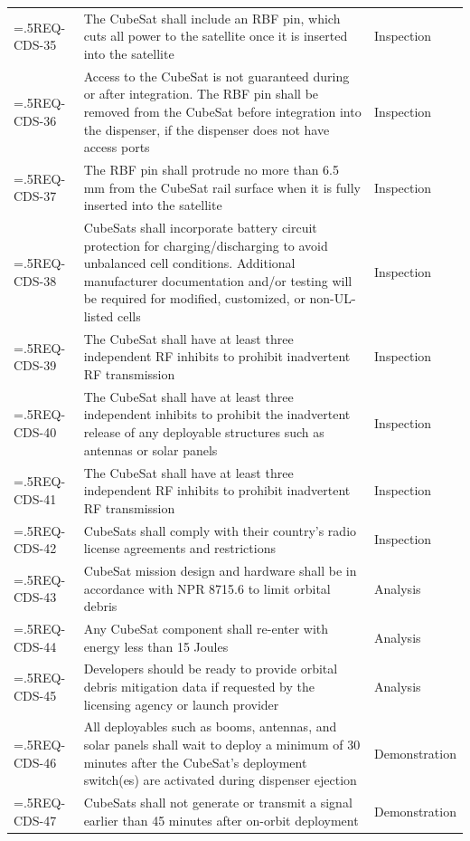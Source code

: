\begin{tabularx}{\columnwidth}{
    >{\hsize=.5\hsize \arraybackslash}X
    >{\hsize=1.5\hsize \arraybackslash}X
    >{\centering\arraybackslash}X}
    REQ-CDS-35 &  The CubeSat shall include an \ac{RBF} pin, which cuts all power to the satellite once it is inserted into the satellite & Inspection \\
    REQ-CDS-36 &  Access to the CubeSat is not guaranteed during or after integration. The \ac{RBF} pin shall be removed from the CubeSat before integration into the dispenser, if the dispenser does not have access ports & Inspection \\
    REQ-CDS-37 &  The \ac{RBF} pin shall protrude no more than 6.5 mm from the CubeSat rail surface when it is fully inserted into the satellite & Inspection \\
    REQ-CDS-38 &  CubeSats shall incorporate battery circuit protection for charging/discharging to avoid unbalanced cell conditions. Additional manufacturer documentation and/or testing will be required for modified, customized, or non-UL-listed cells & Inspection \\
    REQ-CDS-39 &  The CubeSat shall have at least three independent RF inhibits to prohibit inadvertent RF transmission & Inspection \\
    REQ-CDS-40 &  The CubeSat shall have at least three independent inhibits to prohibit the inadvertent release of any deployable structures such as antennas or solar panels & Inspection \\
    REQ-CDS-41 &  The CubeSat shall have at least three independent RF inhibits to prohibit inadvertent RF transmission & Inspection \\
    REQ-CDS-42 &  CubeSats shall comply with their country’s radio license agreements and restrictions & Inspection \\
    REQ-CDS-43 &  CubeSat mission design and hardware shall be in accordance with NPR 8715.6 to limit orbital debris & Analysis \\
    REQ-CDS-44 &  Any CubeSat component shall re-enter with energy less than 15 Joules & Analysis \\
    REQ-CDS-45 &  Developers should be ready to provide orbital debris mitigation data if requested by the licensing agency or launch provider & Analysis \\
    REQ-CDS-46 &  All deployables such as booms, antennas, and solar panels shall wait to deploy a minimum of 30 minutes after the CubeSat's deployment switch(es) are activated during dispenser ejection & Demonstration \\
    REQ-CDS-47 &  CubeSats shall not generate or transmit a signal earlier than 45 minutes after on-orbit deployment & Demonstration \\

\end{tabularx}
